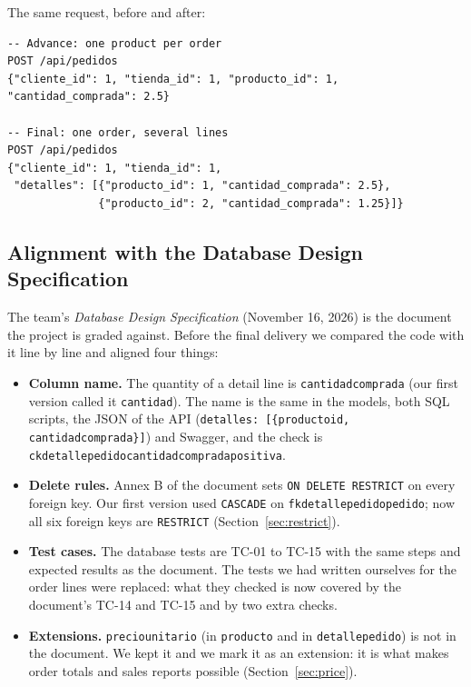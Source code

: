 \documentclass[11pt]{article}
\renewcommand{\_}{\oldus\allowbreak}
\begin{document}
The same request, before and after:

\begin{lstlisting}
-- Advance: one product per order
POST /api/pedidos
{"cliente_id": 1, "tienda_id": 1, "producto_id": 1, "cantidad_comprada": 2.5}

-- Final: one order, several lines
POST /api/pedidos
{"cliente_id": 1, "tienda_id": 1,
 "detalles": [{"producto_id": 1, "cantidad_comprada": 2.5},
              {"producto_id": 2, "cantidad_comprada": 1.25}]}
\end{lstlisting}

\subsection{Alignment with the Database Design Specification}

The team's \emph{Database Design Specification} (November 16, 2026) is the document the project is
graded against. Before the final delivery we compared the code with it line by line and aligned four
things:

\begin{itemize}[itemsep=0.15em]
  \item \textbf{Column name.} The quantity of a detail line is \texttt{cantidad\_comprada} (our first
  version called it \texttt{cantidad}). The name is the same in the models, both SQL scripts, the JSON
  of the API (\texttt{detalles: [\{producto\_id, cantidad\_comprada\}]}) and Swagger, and the check is
  \texttt{ck\_detalle\_pedido\_cantidad\_comprada\_positiva}.
  \item \textbf{Delete rules.} Annex B of the document sets \texttt{ON DELETE RESTRICT} on every foreign
  key. Our first version used \texttt{CASCADE} on \texttt{fk\_detalle\_pedido\_pedido}; now all six
  foreign keys are \texttt{RESTRICT} (Section~\ref{sec:restrict}).
  \item \textbf{Test cases.} The database tests are TC-01 to TC-15 with the same steps and expected
  results as the document. The tests we had written ourselves for the order lines were replaced:
  what they checked is now covered by the document's TC-14 and TC-15 and by two extra checks.
  \item \textbf{Extensions.} \texttt{precio\_unitario} (in \texttt{producto} and in
  \texttt{detalle\_pedido}) is not in the document. We kept it and we mark it as an extension: it is
  what makes order totals and sales reports possible (Section~\ref{sec:price}).
\end{itemize}
\end{document}
